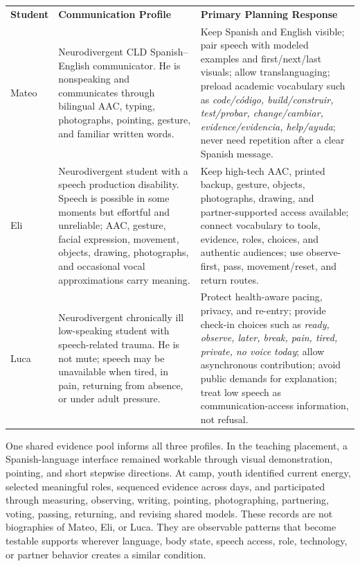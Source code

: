 \documentclass[11pt]{article}
\newcommand{\reviewsection}[1]{%
  \Needspace{4\baselineskip}
  \vspace{0.08in}\noindent{\normalsize\bfseries\color{PrimaryRed}#1}
  \par\vspace{0.025in}
}
\newcommand{\tableheaderthree}[3]{%
  \rowcolor{PrimaryRed}
  \color{white}\bfseries #1 &
  \color{white}\bfseries #2 &
  \color{white}\bfseries #3 \\
}
\begin{document}
\vspace{-0.2cm}
\reviewsection{Three Student Profiles}
\vspace{-0.4cm}
\renewcommand{\arraystretch}{1.0}
\setlength{\tabcolsep}{3pt}
\begin{longtable}{>{\RaggedRight\arraybackslash}p{0.62in} >{\RaggedRight\arraybackslash}p{2.98in} >{\RaggedRight\arraybackslash}p{3.45in}}
\tableheaderthree{Student}{Communication Profile}{Primary Planning Response}

Mateo & Neurodivergent CLD Spanish--English communicator. He is nonspeaking and communicates through bilingual AAC, typing, photographs, pointing, gesture, and familiar written words. & Keep Spanish and English visible; pair speech with modeled examples and first/next/last visuals; allow translanguaging; preload academic vocabulary such as \textit{code/c\'odigo, build/construir, test/probar, change/cambiar, evidence/evidencia, help/ayuda}; never need repetition after a clear Spanish message. \\

\rowcolor{SoftGray}
Eli & Neurodivergent student with a speech production disability. Speech is possible in some moments but effortful and unreliable; AAC, gesture, facial expression, movement, objects, drawing, photographs, and occasional vocal approximations carry meaning. & Keep high-tech AAC, printed backup, gesture, objects, photographs, drawing, and partner-supported access available; connect vocabulary to tools, evidence, roles, choices, and authentic audiences; use observe-first, pass, movement/reset, and return routes. \\

Luca & Neurodivergent chronically ill low-speaking student with speech-related trauma. He is not mute; speech may be unavailable when tired, in pain, returning from absence, or under adult pressure. & Protect health-aware pacing, privacy, and re-entry; provide check-in choices such as \textit{ready, observe, later, break, pain, tired, private, no voice today}; allow asynchronous contribution; avoid public demands for explanation; treat low speech as communication-access information, not refusal. \\

\end{longtable}
\normalsize
\vspace{-0.7cm}
One shared evidence pool informs all three profiles. In the teaching placement, a Spanish-language interface remained workable through visual demonstration, pointing, and short stepwise directions. At camp, youth identified current energy, selected meaningful roles, sequenced evidence across days, and participated through measuring, observing, writing, pointing, photographing, partnering, voting, passing, returning, and revising shared models. These records are not biographies of Mateo, Eli, or Luca. They are observable patterns that become testable supports wherever language, body state, speech access, role, technology, or partner behavior creates a similar condition.
\end{document}

